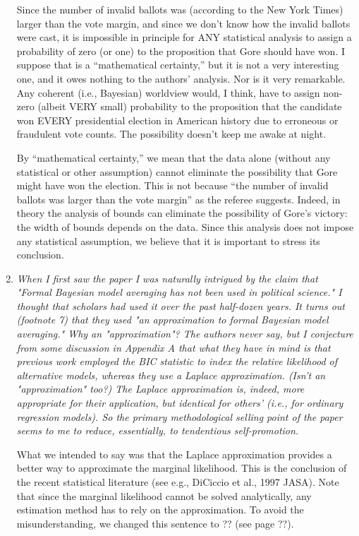 \documentclass[11pt]{article}
\begin{document}
\begin{enumerate}
{    Since the number of invalid ballots was (according to the New York
    Times) larger than the vote margin, and since we don't know how
    the invalid ballots were cast, it is impossible in principle for
    ANY statistical analysis to assign a probability of zero (or one)
    to the proposition that Gore should have won.  I suppose that is a
    ``mathematical certainty,'' but it is not a very interesting one,
    and it owes nothing to the authors' analysis.  Nor is it very
    remarkable.  Any coherent (i.e., Bayesian) worldview would, I
    think, have to assign non-zero (albeit VERY small) probability to
    the proposition that the candidate won EVERY presidential election
    in American history due to erroneous or fraudulent vote counts.
    The possibility doesn't keep me awake at night.}
  
  By ``mathematical certainty,'' we mean that the data alone (without
  any statistical or other assumption) cannot eliminate the
  possibility that Gore might have won the election. This is not
  because ``the number of invalid ballots was larger than the vote
  margin'' as the referee suggests.  Indeed, in theory the analysis of
  bounds can eliminate the possibility of Gore's victory: the width of
  bounds depends on the data. Since this analysis does not impose any
  statistical assumption, we believe that it is important to stress
  its conclusion.
  
\item {\it When I first saw the paper I was naturally intrigued by the
    claim that "Formal Bayesian model averaging has not been used in
    political science."  I thought that scholars had used it over the
    past half-dozen years.  It turns out (footnote 7) that they used
    "an approximation to formal Bayesian model averaging."  Why an
    "approximation"?  The authors never say, but I conjecture from
    some discussion in Appendix A that what they have in mind is that
    previous work employed the BIC statistic to index the relative
    likelihood of alternative models, whereas they use a Laplace
    approximation.  (Isn't an "approximation" too?)  The Laplace
    approximation is, indeed, more appropriate for their application,
    but identical for others' (i.e., for ordinary regression models).
    So the primary methodological selling point of the paper seems to
    me to reduce, essentially, to tendentious self-promotion.}
  
  What we intended to say was that the Laplace approximation provides
  a better way to approximate the marginal likelihood. This is the
  conclusion of the recent statistical literature (see e.g., DiCiccio
  et al., 1997 JASA).  Note that since the marginal likelihood cannot
  be solved analytically, any estimation method has to rely on the
  approximation.  To avoid the misunderstanding, we changed this
  sentence to ?? (see page ??).
  

\end{enumerate}
\end{document}
